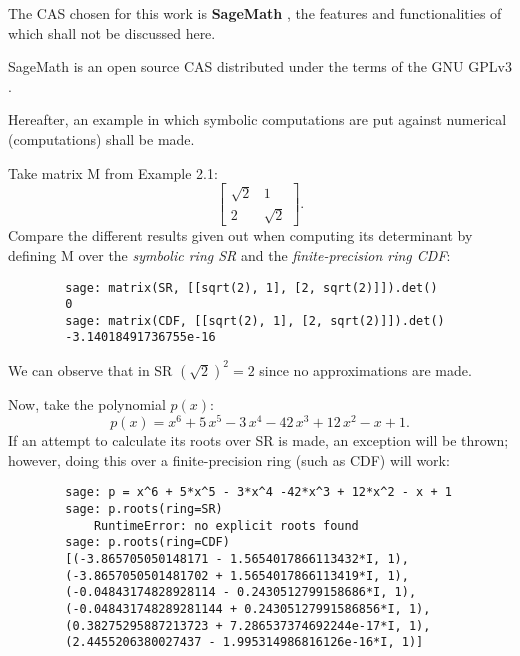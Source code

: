 The CAS chosen for this work is \textbf{SageMath} \cite{sage}, the features and functionalities of which shall not
be discussed here.

SageMath is an open source CAS distributed under the terms of the GNU GPLv3 \cite{gpl}.

Hereafter, an example in which symbolic computations are put against numerical (computations) shall be made.
\begin{example}
    Take matrix M from Example 2.1:
    \[
        \begin{bmatrix}
            \sqrt{2}  &   1    \\
                2     & \sqrt{2}
        \end{bmatrix}.
    \]
    Compare the different results given out when computing its determinant by defining M over the \textit{symbolic ring SR} and
    the \textit{finite-precision ring CDF}:
    \begin{verbatim}
        sage: matrix(SR, [[sqrt(2), 1], [2, sqrt(2)]]).det()
        0
        sage: matrix(CDF, [[sqrt(2), 1], [2, sqrt(2)]]).det()
        -3.14018491736755e-16
    \end{verbatim}
    We can observe that in SR \((\sqrt{2})^2 = 2\) since no approximations are made.

    Now, take the polynomial \(p(x)\):
    \[
        p(x) = x^{6} + 5 \, x^{5} - 3 \, x^{4} - 42 \, x^{3} + 12 \, x^{2} - x + 1.
    \]
    If an attempt to calculate its roots over SR is made, an exception will be thrown; however, doing this over a
    finite-precision ring (such as CDF) will work:
    \begin{verbatim}
        sage: p = x^6 + 5*x^5 - 3*x^4 -42*x^3 + 12*x^2 - x + 1
        sage: p.roots(ring=SR)
            RuntimeError: no explicit roots found
        sage: p.roots(ring=CDF)
        [(-3.865705050148171 - 1.5654017866113432*I, 1),
        (-3.8657050501481702 + 1.5654017866113419*I, 1),
        (-0.04843174828928114 - 0.2430512799158686*I, 1),
        (-0.048431748289281144 + 0.24305127991586856*I, 1),
        (0.38275295887213723 + 7.286537374692244e-17*I, 1),
        (2.4455206380027437 - 1.995314986816126e-16*I, 1)]
    \end{verbatim}
\end{example}

